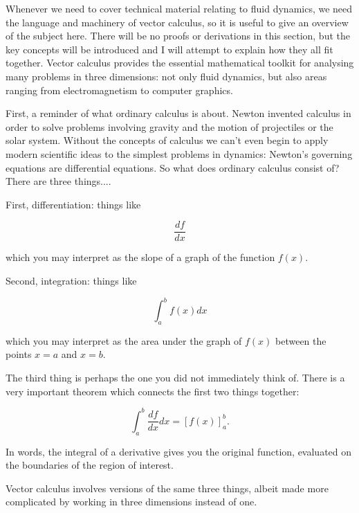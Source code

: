   Whenever we need to cover technical material relating to fluid dynamics, we 
  need the language and machinery of vector calculus, so it is useful to give 
  an overview of the subject here. There will be no proofs or derivations in 
  this section, but the key concepts will be introduced and I will attempt to 
  explain how they all fit together. Vector calculus provides the essential 
  mathematical toolkit for analysing many problems in three dimensions: not 
  only fluid dynamics, but also areas ranging from electromagnetism to computer 
  graphics. 

  First, a reminder of what ordinary calculus is about. Newton invented 
  calculus in order to solve problems involving gravity and the motion of 
  projectiles or the solar system. Without the concepts of calculus we can't 
  even begin to apply modern scientific ideas to the simplest problems in 
  dynamics: Newton's governing equations are differential equations. So what 
  does ordinary calculus consist of? There are three things.... 

  First, differentiation: things like 

  \begin{equation*}\dfrac{df}{dx}\end{equation*} 

  \noindent{}which you may interpret as the slope of a graph of the function 
  $f(x)$. 

  Second, integration: things like 

  \begin{equation*}\int_a^b{f(x) dx}\end{equation*} 

  \noindent{}which you may interpret as the area under the graph of $f(x)$ 
  between the points $x=a$ and $x=b$. 

  The third thing is perhaps the one you did not immediately think of. There is 
  a very important theorem which connects the first two things together: 

  \begin{equation*}\int_a^b{\dfrac{df}{dx} dx} = [f(x)]_a^b . 
  \tag{1}\end{equation*} 

  In words, the integral of a derivative gives you the original function, 
  evaluated on the boundaries of the region of interest. 

  Vector calculus involves versions of the same three things, albeit made more 
  complicated by working in three dimensions instead of one. 

